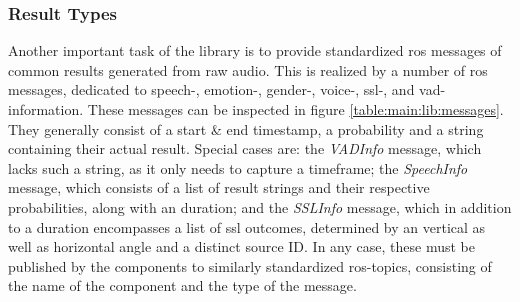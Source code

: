 \subsubsection{Result Types}
\label{main:lib:message_types}
Another important task of the library is to provide standardized \gls{ros} messages of common results generated from raw audio.
This is realized by a number of \gls{ros} messages, dedicated to speech-, emotion-, gender-, voice-, \gls{ssl}-, and \gls{vad}- information.
These messages can be inspected in figure \ref{table:main:lib:messages}.
They generally consist of a start \& end timestamp, a probability and a string containing their actual result.
Special cases are:
the \textit{VADInfo} message, which lacks such a string, as it only needs to capture a timeframe;
the \textit{SpeechInfo} message, which consists of a list of result strings and their respective probabilities, along with an duration;
and the \textit{SSLInfo} message, which in addition to a duration encompasses a list of \gls{ssl} outcomes, determined by an vertical as well as horizontal angle and a distinct source ID.
In any case, these must be published by the components to similarly standardized \gls{ros}-topics, consisting of the name of the component and the type of the message.


